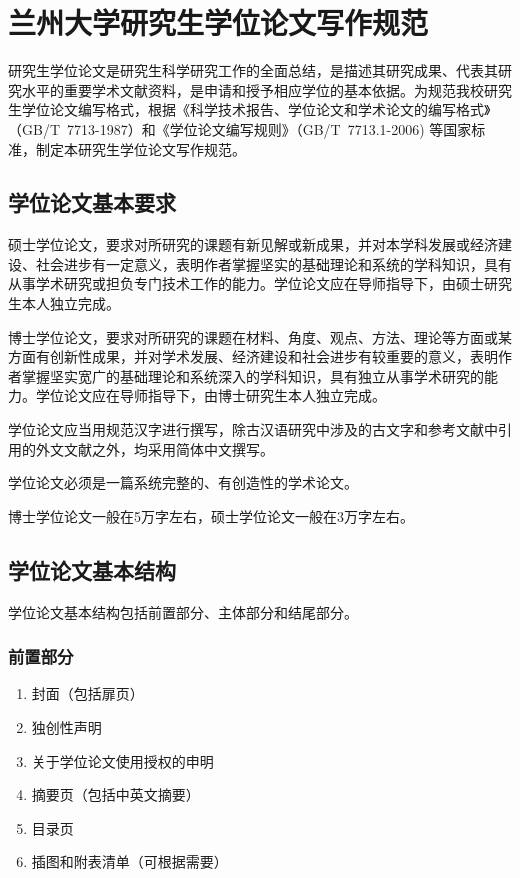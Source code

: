 \documentclass[twoside,longtitle]{LZUthesis}
\begin{document}
\chapter[论文写作规范]{兰州大学研究生学位论文写作规范\label{chap:standard}}

研究生学位论文是研究生科学研究工作的全面总结，是描述其研究成果、代表其研究水平的重要学术文献资料，是申请和授予相应学位的基本依据。为规范我校研究生学位论文编写格式，根据《科学技术报告、学位论文和学术论文的编写格式》（GB/T~7713-1987）和《学位论文编写规则》（GB/T~7713.1-2006) 等国家标准，制定本研究生学位论文写作规范。


\section{学位论文基本要求}

硕士学位论文，要求对所研究的课题有新见解或新成果，并对本学科发展或经济建设、社会进步有一定意义，表明作者掌握坚实的基础理论和系统的学科知识，具有从事学术研究或担负专门技术工作的能力。学位论文应在导师指导下，由硕士研究生本人独立完成。

博士学位论文，要求对所研究的课题在材料、角度、观点、方法、理论等方面或某方面有创新性成果，并对学术发展、经济建设和社会进步有较重要的意义，表明作者掌握坚实宽广的基础理论和系统深入的学科知识，具有独立从事学术研究的能力。学位论文应在导师指导下，由博士研究生本人独立完成。

学位论文应当用规范汉字进行撰写，除古汉语研究中涉及的古文字和参考文献中引用的外文文献之外，均采用简体中文撰写。

学位论文必须是一篇系统完整的、有创造性的学术论文。

博士学位论文一般在5万字左右，硕士学位论文一般在3万字左右。


\section{学位论文基本结构}

学位论文基本结构包括前置部分、主体部分和结尾部分。


\subsection{前置部分}
\begin{enumerate}
\item 封面（包括扉页）
\item 独创性声明
\item 关于学位论文使用授权的申明
\item 摘要页（包括中英文摘要）
\item 目录页
\item 插图和附表清单（可根据需要）
\end{enumerate}
\end{document}
